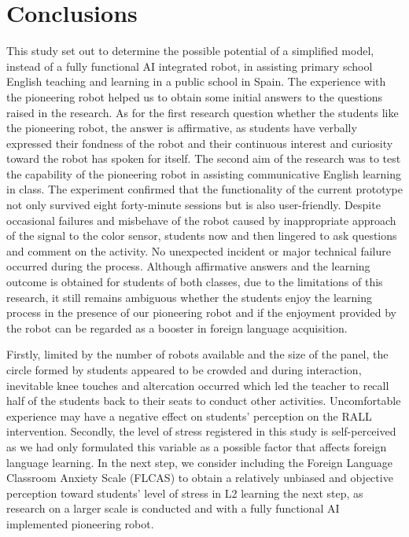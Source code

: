 \documentclass[english]{textolivre}
\begin{document}
\section{Conclusions}\label{sec-listas}
This study set out to determine the possible potential of a simplified model, instead of a fully functional AI integrated robot, in assisting primary school English teaching and learning in a public school in Spain. The experience with the pioneering robot helped us to obtain some initial answers to the questions raised in the research. As for the first research question whether the students like the pioneering robot, the answer is affirmative, as students have verbally expressed their fondness of the robot and their continuous interest and curiosity toward the robot has spoken for itself. The second aim of the research was to test the capability of the pioneering robot in assisting communicative English learning in class. The experiment confirmed that the functionality of the current prototype not only survived eight forty-minute sessions but is also user-friendly. Despite occasional failures and misbehave of the robot caused by inappropriate approach of the signal to the color sensor, students now and then lingered to ask questions and comment on the activity. No unexpected incident or major technical failure occurred during the process. Although affirmative answers and the learning outcome is obtained for students of both classes, due to the limitations of this research, it still remains ambiguous whether the students enjoy the learning process in the presence of our pioneering robot and if the enjoyment provided by the robot can be regarded as a booster in foreign language acquisition.

Firstly, limited by the number of robots available and the size of the panel, the circle formed by students appeared to be crowded and during interaction, inevitable knee touches and altercation occurred which led the teacher to recall half of the students back to their seats to conduct other activities. Uncomfortable experience may have a negative effect on students’ perception on the RALL intervention. Secondly, the level of stress registered in this study is self-perceived as we had only formulated this variable as a possible factor that affects foreign language learning. In the next step, we consider including the Foreign Language Classroom Anxiety Scale (FLCAS) to obtain a relatively unbiased and objective perception toward students’ level of stress in L2 learning the next step, as research on a larger scale is conducted and with a fully functional AI implemented pioneering robot.
\end{document}
